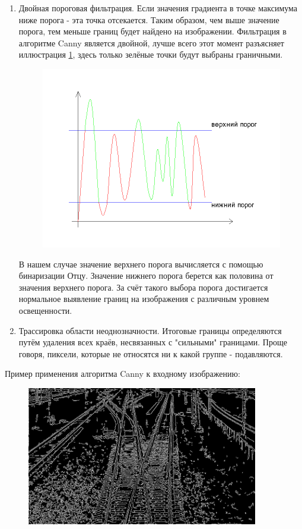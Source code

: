 \begin{enumerate}
	\item Двойная пороговая фильтрация. Если значения градиента в точке максимума ниже порога - эта точка отсекается. Таким образом, чем выше значение порога, тем меньше границ будет найдено на изображении. Фильтрация в алгоритме Canny является двойной, лучше всего этот момент разъясняет иллюстрация \ref{fig:cannyth}, здесь только зелёные точки будут выбраны граничными.
	\begin{figure}[!h]
		\centering
		\includegraphics[width=0.7\linewidth]{pictures/canny_th}
		\caption[Двойная фильтрация]{}
		\label{fig:cannyth}
	\end{figure}
	В нашем случае значение верхнего порога вычисляется с помощью бинаризации Отцу\cite{b:otsu}. Значение нижнего порога берется как половина от значения верхнего порога. За счёт такого выбора порога достигается нормальное выявление границ на изображения с различным уровнем освещенности.
	\newpage
	\item Трассировка области неоднозначности. Итоговые границы определяются путём удаления всех краёв, несвязанных с "сильными" границами. Проще говоря, пиксели, которые не относятся ни к какой группе - подавляются.
\end{enumerate}
Пример применения алгоритма Canny к входному изображению:
\begin{figure}[!h]
	\centering
	\includegraphics[width=0.9\textwidth]{pictures/canny_res}
	\caption[Применение алгоритма Canny]{}
	\label{fig:cannyres}
\end{figure}

